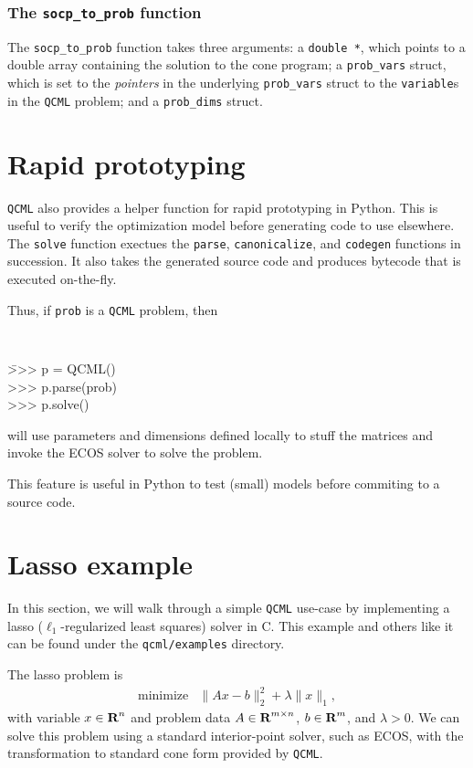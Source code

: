 \documentclass[11pt]{article}
\def\qcml{\texttt{QCML}\xspace}
\newcommand{\reals}{{\mbox{\bf R}}}
\begin{document}
\subsubsection{The {\tt socp\_to\_prob} function}
The {\tt socp\_to\_prob} function takes three arguments: a {\tt double *}, which
points to a double array containing the solution to the cone program; 
a {\tt prob\_vars} struct, which is set to
the \emph{pointers} in the underlying {\tt prob\_vars} struct to the 
{\tt variable}s in the \qcml problem; and a {\tt prob\_dims} struct.


\section{Rapid prototyping}
\qcml also provides a helper function for rapid prototyping in Python. This
is useful to verify the optimization model before generating code to use
elsewhere. The {\tt solve} function exectues the {\tt parse}, {\tt canonicalize},
and {\tt codegen} functions in succession. It also takes the generated source
code and produces bytecode that is executed on-the-fly.

Thus, if {\tt prob} is a \qcml problem, then
{\tt
\begin{tabbing}
  \qquad \= >>> p = QCML() \\
  \> >>> p.parse(prob) \\
  \> >>> p.solve()
\end{tabbing}
}
\noindent 
will use parameters and dimensions defined locally to stuff the matrices and
invoke the ECOS solver to solve the problem.

This feature is useful in Python to test (small) models before commiting to 
a source code.

\section{Lasso example}
In this section, we will walk through a simple \qcml use-case by implementing
a lasso ($\ell_1$-regularized least squares) solver in C. This example
and others like it can be found under the {\tt qcml/examples} directory.

The lasso problem is
\[
\begin{array}{ll}
  \mbox{minimize} & \|Ax - b\|_2^2 + \lambda \|x\|_1,
\end{array}
\]
with variable $x \in \reals^n$ and problem data $A\in\reals^{m\times n}$, 
$b \in \reals^m$, and $\lambda > 0$. We can solve this problem using a
standard interior-point solver, such as ECOS, with the transformation
to standard cone form provided by \qcml.
\end{document}
